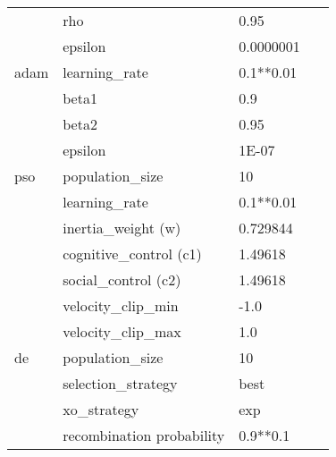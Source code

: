 \begin{table}[htbp]
{\begin{tabular}{llll}
                                     & rho                       & 0.95           &                            \\
                                     & epsilon                   & 0.0000001      &                            \\
                  adam               & learning\_rate            & 0.1**0.01      & ~\cite{ref:kingma:2014}    \\
                                     & beta1                     & 0.9            &                            \\
                                     & beta2                     & 0.95           &                            \\
                                     & epsilon                   & 1E-07          &                            \\
                  pso                & population\_size          & 10             & ~\cite{ref:van:2010}       \\
                                     & learning\_rate            & 0.1**0.01      &                            \\
                                     & inertia\_weight (w)       & 0.729844       &                            \\
                                     & cognitive\_control (c1)   & 1.49618        &                            \\
                                     & social\_control (c2)      & 1.49618        &                            \\
                                     & velocity\_clip\_min       & -1.0           &                            \\
                                     & velocity\_clip\_max       & 1.0            &                            \\
                  de                 & population\_size          & 10             & ~\cite{ref:mezura:2006}    \\
                                     & selection\_strategy       & best           &                            \\
                                     & xo\_strategy              & exp            &                            \\
                                     & recombination probability & 0.9**0.1       &                            \\

\end{tabular}}
\end{table}
